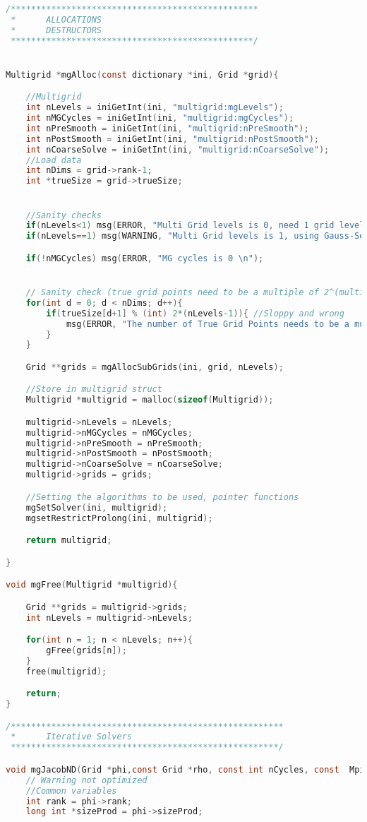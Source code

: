 \begin{lstlisting}[language=c, caption = main routine]
/*************************************************
 * 		ALLOCATIONS
 * 		DESTRUCTORS
 ************************************************/


Multigrid *mgAlloc(const dictionary *ini, Grid *grid){

	//Multigrid
	int nLevels = iniGetInt(ini, "multigrid:mgLevels");
	int nMGCycles = iniGetInt(ini, "multigrid:mgCycles");
	int nPreSmooth = iniGetInt(ini, "multigrid:nPreSmooth");
	int nPostSmooth = iniGetInt(ini, "multigrid:nPostSmooth");
	int nCoarseSolve = iniGetInt(ini, "multigrid:nCoarseSolve");
	//Load data
	int nDims = grid->rank-1;
	int *trueSize = grid->trueSize;


	//Sanity checks
	if(nLevels<1) msg(ERROR, "Multi Grid levels is 0, need 1 grid level \n");
	if(nLevels==1) msg(WARNING, "Multi Grid levels is 1, using Gauss-Seidel Red'Black \n");

	if(!nMGCycles) msg(ERROR, "MG cycles is 0 \n");


	// Sanity check (true grid points need to be a multiple of 2^(multigrid levels)
	for(int d = 0; d < nDims; d++){
		if(trueSize[d+1] % (int) 2*(nLevels-1)){ //Sloppy and wrong
			msg(ERROR, "The number of True Grid Points needs to be a multiple of 2^nLevels");
		}
	}

	Grid **grids = mgAllocSubGrids(ini, grid, nLevels);

	//Store in multigrid struct
    Multigrid *multigrid = malloc(sizeof(Multigrid));

    multigrid->nLevels = nLevels;
    multigrid->nMGCycles = nMGCycles;
	multigrid->nPreSmooth = nPreSmooth;
	multigrid->nPostSmooth = nPostSmooth;
	multigrid->nCoarseSolve = nCoarseSolve;
    multigrid->grids = grids;

    //Setting the algorithms to be used, pointer functions
	mgSetSolver(ini, multigrid);
	mgsetRestrictProlong(ini, multigrid);

  	return multigrid;

}

void mgFree(Multigrid *multigrid){

	Grid **grids = multigrid->grids;
	int nLevels = multigrid->nLevels;

	for(int n = 1; n < nLevels; n++){
		gFree(grids[n]);
	}
	free(multigrid);

	return;
}

/******************************************************
 *		Iterative Solvers
 *****************************************************/

void mgJacobND(Grid *phi,const Grid *rho, const int nCycles, const  MpiInfo *mpiInfo){
	// Warning not optimized
	//Common variables
	int rank = phi->rank;
	long int *sizeProd = phi->sizeProd;


\end{lstlisting}
